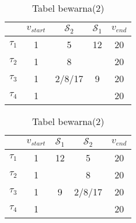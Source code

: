 \begin{table}[H]
	\begin{minipage}[c]{0.49\linewidth}
		\centering
		\caption{Tabel bewarna(1)}
		\label{tab:cthwarna1}
		\begin{tabular}{ccccc}
			\toprule
			 & $v_{start}$ & $\mathcal{S}_{2}$ & $\mathcal{S}_{1}$ & $v_{end}$\\
			
			\midrule
			$\tau_{1}$ & 1 & 5 \cellcolor{green}& 12& 20\\
			$\tau_{2}$ & 1 & 8 \cellcolor{green}& & 20\\
			$\tau_{3}$ & 1 & 2/8/17 \cellcolor{green}& 9 & 20\\
			$\tau_{4}$ & 1 & \cellcolor{red}& & 20\\
			
			\bottomrule

		\end{tabular}
	\end{minipage}
	\begin{minipage}[c]{0.49\linewidth}
		
		\centering 
		\caption{Tabel bewarna(2)}
		\label{tab:cthwarna2}
		\begin{tabular}{ccccc}
			\toprule
			 & $v_{start}$ & $\mathcal{S}_{1}$ & $\mathcal{S}_{2}$ & $v_{end}$\\
			
			\midrule
			$\tau_{1}$ & 1 & 12& 5 \cellcolor{red} &20\\
			$\tau_{2}$ & 1 &  &  8 \cellcolor{green} &20\\
			$\tau_{3}$ & 1 & 9 & 2/8/17 \cellcolor{green} &20\\
			$\tau_{4}$ & 1 &   & \cellcolor{red} &20\\
			
			\bottomrule
		
		\end{tabular}
	\end{minipage}
\end{table}

 
